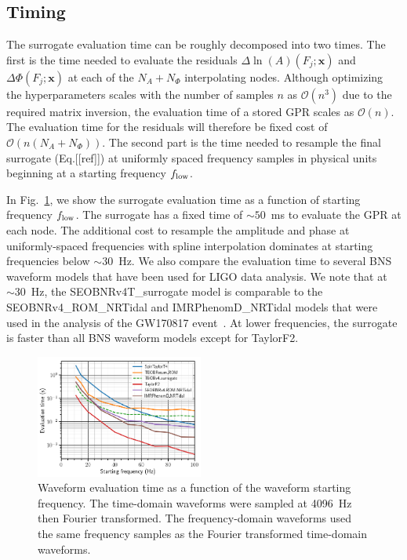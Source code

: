 \documentclass[prd,aps,letter,twocolumn,floatfix,notitlepage,nofootinbib]{revtex4-1}
\def\bx{\mathbf{x}}
\begin{document}
\subsection{Timing}

The surrogate evaluation time can be roughly decomposed into two times. The first is the time needed to evaluate the residuals $\Delta\ln(A)(F_j; \bx)$ and $\Delta\Phi(F_j; \bx)$ at each of the $N_A+N_\Phi$ interpolating nodes. Although optimizing the hyperparameters scales with the number of samples $n$ as $\mathcal{O}(n^3)$ due to the required matrix inversion, the evaluation time of a stored GPR scales as $\mathcal{O}(n)$. The evaluation time for the residuals will therefore be fixed cost of $\mathcal{O}(n(N_A+N_\Phi))$. The second part is the time needed to resample the final surrogate (Eq.[[ref]]) at uniformly spaced frequency samples in physical units beginning at a starting frequency $f_{\rm low}$.

In Fig.~\ref{fig:timing}, we show the surrogate evaluation time as a function of starting frequency $f_{\rm low}$. The surrogate has a fixed time of $\sim 50$~ms to evaluate the GPR at each node. The additional cost to resample the amplitude and phase at uniformly-spaced frequencies with spline interpolation dominates at starting frequencies below $\sim 30$~Hz. We also compare the evaluation time to several BNS waveform models that have been used for LIGO data analysis. We note that at $\sim 30$~Hz, the SEOBNRv4T\_surrogate model is comparable to the SEOBNRv4\_ROM\_NRTidal and IMRPhenomD\_NRTidal models that were used in the analysis of the GW170817 event~\cite{DietrichBernuzziTichy2017}. At lower frequencies, the surrogate is faster than all BNS waveform models except for TaylorF2. 

\begin{figure}[htb]
\centering
\includegraphics[width=0.49\textwidth]{timing.png}
\caption{Waveform evaluation time as a function of the waveform starting frequency. The time-domain waveforms
were sampled at 4096~Hz then Fourier transformed. The frequency-domain waveforms used the
same frequency samples as the Fourier transformed time-domain waveforms.}
\label{fig:timing}
\end{figure}
\end{document}
